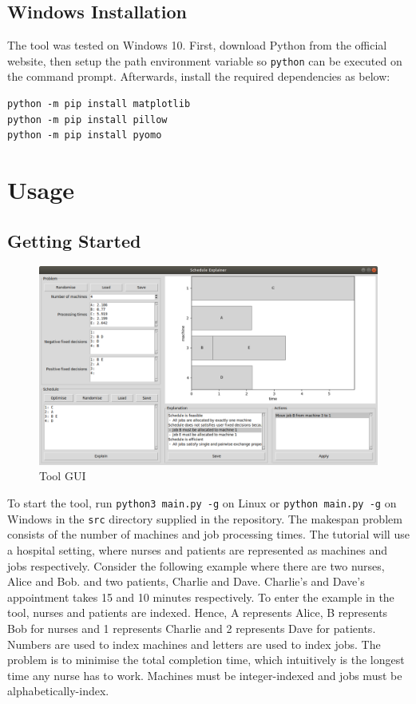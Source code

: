 \subsection{Windows Installation}

The tool was tested on Windows 10. First, download Python from the official website, then setup the path environment variable so \texttt{python} can be executed on the command prompt. Afterwards, install the required dependencies as below: 

\begin{verbatim}
python -m pip install matplotlib
python -m pip install pillow
python -m pip install pyomo
\end{verbatim}

\section{Usage}

\subsection{Getting Started}

\begin{figure}[H]
	\centering
	\includegraphics[width=\linewidth]{figures/tool_gui.png}
	\caption{Tool GUI}
\end{figure}

To start the tool, run \texttt{python3 main.py -g} on Linux or \texttt{python main.py -g} on Windows in the \texttt{src} directory supplied in the repository.
\linespace
The makespan problem consists of the number of machines and job processing times. The tutorial will use a hospital setting, where nurses and patients are represented as machines and jobs respectively. Consider the following example where there are two nurses, Alice and Bob. and two patients, Charlie and Dave. Charlie's and Dave's appointment takes 15 and 10 minutes respectively. To enter the example in the tool, nurses and patients are indexed. Hence, A represents Alice, B represents Bob for nurses and 1 represents Charlie and 2 represents Dave for patients. Numbers are used to index machines and letters are used to index jobs. The problem is to minimise the total completion time, which intuitively is the longest time any nurse has to work. Machines must be integer-indexed and jobs must be alphabetically-index.

